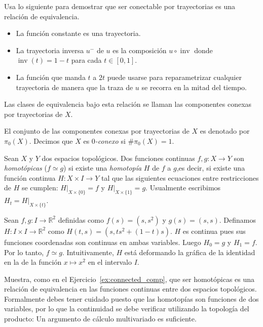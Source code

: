 \documentclass{standalone}
\begin{document}
	
	\begin{exercise}\label{ex:connected_comp}
		Usa lo siguiente para demostrar que ser conectable por trayectorias es una relación de equivalencia.
		\begin{itemize}
			\item La función constante es una trayectoria.
			\item La trayectoria inversa $u^{-}$ de $u$ es la composición $u\circ \operatorname{inv}$ donde $\operatorname{inv}(t) = 1-t$ para cada $t\in[0,1]$.
			\item La función que manda $t$ a $2t$ puede usarse para reparametrizar cualquier trayectoria de manera que la traza de $u$ se recorra en la mitad del tiempo.
		\end{itemize}
		Las clases de equivalencia bajo esta relación se llaman las componentes conexas por trayectorias de $X$.
	\end{exercise}
	
	\begin{definition}\label{defn:0_connected}
		El conjunto de las componentes conexas por trayectorias de $X$ es denotado por $\pi_{0}(X)$. Decimos que $X$ es \emph{$0$-conexo} si $\#\pi_{0}(X)=1$.
	\end{definition}
	
	
	\begin{definition}\label{defn:homotopy}
		Sean $X$ y $Y$ dos espacios topológicos. Dos funciones continuas $f,g\colon X\rightarrow Y$ son \emph{homotópicas} ($f\simeq g$) si existe una \emph{homotopía} $H$ de $f$ a $g$,es decir, si existe una función continua $H\colon X\times I\rightarrow Y$ tal que las siguientes ecuaciones entre restricciones de $H$ se cumplen: $H|_{X\times\{0\}}=f$ y $H|_{X\times\{1\}}=g$. Usualmente escribimos $H_{t}=H|_{X\times\{t\}}$.
	\end{definition}
	
	\begin{example}
		Sean $f,g\colon I\rightarrow\mathbb{R}^{2}$ definidas como $f(s) = (s,s^{2})$ y $g(s)=(s,s)$. Definamos $H\colon I\times I\rightarrow\mathbb{R}^{2}$ como $H(t,s) = (s, ts^{2}+(1-t)s)$. $H$ es continua pues sus funciones coordenadas son continuas en ambas variables. Luego $H_{0} = g$ y $H_{1} = f$. Por lo tanto, $f\simeq g$. Intuitivamente, $H$ está deformando la gráfica de la identidad en la de la función $x\mapsto x^{2}$ en el intervalo $I$.
	\end{example}
	
	
	
	\begin{exercise}\label{rem:homotopy_rel_equiv}
		Muestra, como en el Ejercicio~\ref{ex:connected_comp}, que ser homotópicas es una relación de equivalencia en las funciones continuas entre dos espacios topológicos. Formalmente debes tener cuidado puesto que las homotopías son funciones de dos variables, por lo que la continuidad se debe verificar utilizando la topología del producto: Un argumento de cálculo multivariado es suficiente.
	\end{exercise}
	
\end{document}
